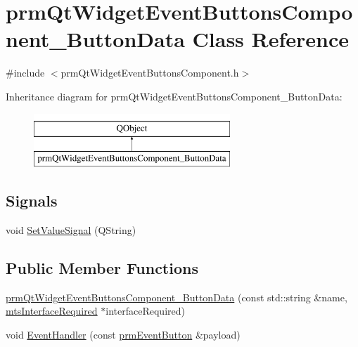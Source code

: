 \hypertarget{classprm_qt_widget_event_buttons_component___button_data}{}\section{prm\+Qt\+Widget\+Event\+Buttons\+Component\+\_\+\+Button\+Data Class Reference}
\label{classprm_qt_widget_event_buttons_component___button_data}


{\ttfamily \#include $<$prm\+Qt\+Widget\+Event\+Buttons\+Component.\+h$>$}

Inheritance diagram for prm\+Qt\+Widget\+Event\+Buttons\+Component\+\_\+\+Button\+Data\+:\begin{figure}[H]
\begin{center}
\leavevmode
\includegraphics[height=2.000000cm]{d6/d93/classprm_qt_widget_event_buttons_component___button_data}
\end{center}
\end{figure}
\subsection*{Signals}
\begin{DoxyCompactItemize}
\item 
void \hyperlink{classprm_qt_widget_event_buttons_component___button_data_ab4cf021a6448593acf4efdf52f5fca21}{Set\+Value\+Signal} (Q\+String)
\end{DoxyCompactItemize}
\subsection*{Public Member Functions}
\begin{DoxyCompactItemize}
\item 
\hyperlink{classprm_qt_widget_event_buttons_component___button_data_a8d54aa9c0bb6f28ce10d1398a72e9cdb}{prm\+Qt\+Widget\+Event\+Buttons\+Component\+\_\+\+Button\+Data} (const std\+::string \&name, \hyperlink{classmts_interface_required}{mts\+Interface\+Required} $\ast$interface\+Required)
\item 
void \hyperlink{classprm_qt_widget_event_buttons_component___button_data_a982a7c664eccf38d1f587d22e6d2c147}{Event\+Handler} (const \hyperlink{classprm_event_button}{prm\+Event\+Button} \&payload)
\end{DoxyCompactItemize}

